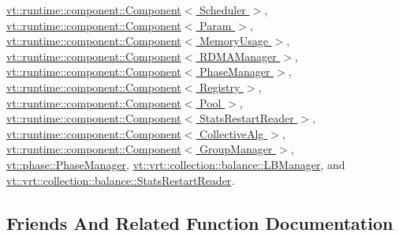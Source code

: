 \hyperlink{structvt_1_1runtime_1_1component_1_1_component_aad3974307ab3b2e1df389a91310f68c2}{vt\+::runtime\+::component\+::\+Component$<$ Scheduler $>$}, \hyperlink{structvt_1_1runtime_1_1component_1_1_component_aad3974307ab3b2e1df389a91310f68c2}{vt\+::runtime\+::component\+::\+Component$<$ Param $>$}, \hyperlink{structvt_1_1runtime_1_1component_1_1_component_aad3974307ab3b2e1df389a91310f68c2}{vt\+::runtime\+::component\+::\+Component$<$ Memory\+Usage $>$}, \hyperlink{structvt_1_1runtime_1_1component_1_1_component_aad3974307ab3b2e1df389a91310f68c2}{vt\+::runtime\+::component\+::\+Component$<$ R\+D\+M\+A\+Manager $>$}, \hyperlink{structvt_1_1runtime_1_1component_1_1_component_aad3974307ab3b2e1df389a91310f68c2}{vt\+::runtime\+::component\+::\+Component$<$ Phase\+Manager $>$}, \hyperlink{structvt_1_1runtime_1_1component_1_1_component_aad3974307ab3b2e1df389a91310f68c2}{vt\+::runtime\+::component\+::\+Component$<$ Registry $>$}, \hyperlink{structvt_1_1runtime_1_1component_1_1_component_aad3974307ab3b2e1df389a91310f68c2}{vt\+::runtime\+::component\+::\+Component$<$ Pool $>$}, \hyperlink{structvt_1_1runtime_1_1component_1_1_component_aad3974307ab3b2e1df389a91310f68c2}{vt\+::runtime\+::component\+::\+Component$<$ Stats\+Restart\+Reader $>$}, \hyperlink{structvt_1_1runtime_1_1component_1_1_component_aad3974307ab3b2e1df389a91310f68c2}{vt\+::runtime\+::component\+::\+Component$<$ Collective\+Alg $>$}, \hyperlink{structvt_1_1runtime_1_1component_1_1_component_aad3974307ab3b2e1df389a91310f68c2}{vt\+::runtime\+::component\+::\+Component$<$ Group\+Manager $>$}, \hyperlink{structvt_1_1phase_1_1_phase_manager_a541d1f6c7a350fad979911ac60f38025}{vt\+::phase\+::\+Phase\+Manager}, \hyperlink{structvt_1_1vrt_1_1collection_1_1balance_1_1_l_b_manager_add5427abf4c6e21e39f581635997ddac}{vt\+::vrt\+::collection\+::balance\+::\+L\+B\+Manager}, and \hyperlink{structvt_1_1vrt_1_1collection_1_1balance_1_1_stats_restart_reader_a0a2bd4e4f989766216237d6aedfaaa51}{vt\+::vrt\+::collection\+::balance\+::\+Stats\+Restart\+Reader}.



\subsection{Friends And Related Function Documentation}
\mbox{\label{structvt_1_1runtime_1_1component_1_1_base_component_a82123f8d3dae68c38bd13d269d00b4c5}} 
